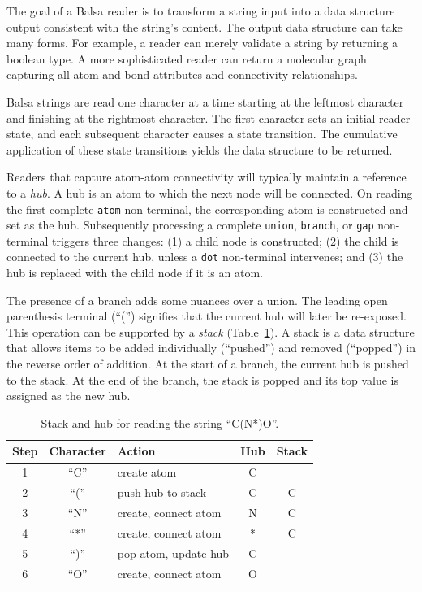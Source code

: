 \documentclass{article}
\def\ttt{\texttt}
\begin{document}
The goal of a Balsa reader is to transform a string input into a data structure output consistent with the string's content. The output data structure can take many forms. For example, a reader can merely validate a string by returning a boolean type. A more sophisticated reader can return a molecular graph capturing all atom and bond attributes and connectivity relationships.

Balsa strings are read one character at a time starting at the leftmost character and finishing at the rightmost character. The first character sets an initial reader state, and each subsequent character causes a state transition. The cumulative application of these state transitions yields the data structure to be returned.

Readers that capture atom-atom connectivity will typically maintain a reference to a \textit{hub}. A hub is an atom to which the next node will be connected. On reading the first complete \ttt{atom} non-terminal, the corresponding atom is constructed and set as the hub. Subsequently processing a complete \ttt{union}, \ttt{branch}, or \ttt{gap} non-terminal triggers three changes: (1) a child node is constructed; (2) the child is connected to the current hub, unless a \ttt{dot} non-terminal intervenes; and (3) the hub is replaced with the child node if it is an atom.

The presence of a branch adds some nuances over a union. The leading open parenthesis terminal (\enquote{(}) signifies that the current hub will later be re-exposed. This operation can be supported by a \textit{stack} (Table~\ref{table:stack-for-branches}). A stack is a data structure that allows items to be added individually (\enquote{pushed}) and removed (\enquote{popped}) in the reverse order of addition. At the start of a branch, the current hub is pushed to the stack. At the end of the branch, the stack is popped and its top value is assigned as the new hub.

\begin{table}
    \caption{Stack and hub for reading the string \enquote{C(N*)O}.}
    \centering
    \begin{tabular}{c c l c c}
        \hline
        Step & Character   & Action                          & Hub & Stack \\
        \hline
        1    & \enquote{C} & create atom                     & C   &       \\
        2    & \enquote{(} & push hub to stack               & C   &  C    \\
        3    & \enquote{N} & create, connect atom            & N   &  C    \\
        4    & \enquote{*} & create, connect atom            & *   &  C    \\
        5    & \enquote{)} & pop atom, update hub            & C   &       \\
        6    & \enquote{O} & create, connect atom            & O   &       \\
        \hline
    \end{tabular}
    \label{table:stack-for-branches}
\end{table}
\end{document}
